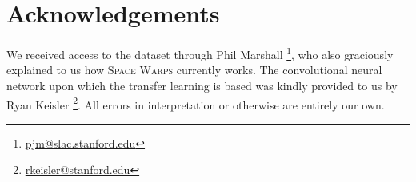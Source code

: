 \documentclass[10pt,twocolumn,letterpaper]{article}
\begin{document}
\section{Acknowledgements}
We received access to the dataset through Phil Marshall
\footnote{\url{pjm@slac.stanford.edu}}, who also graciously explained to us how
\textsc{Space Warps}
currently works. The convolutional neural network upon which the transfer
learning is based was kindly provided to us by Ryan Keisler
\footnote{\url{rkeisler@stanford.edu}}.
All errors in interpretation or otherwise are entirely our own.


{\small


}
\end{document}
